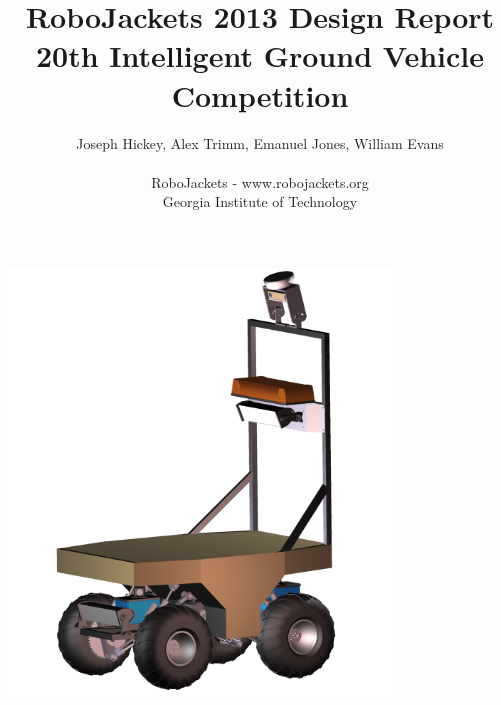 \documentclass[letterpaper,12pt]{article}
\title{RoboJackets 2013 Design Report\\\large{20th Intelligent Ground Vehicle Competition}}
\author{
Joseph Hickey, Alex Trimm, Emanuel Jones, William Evans
\\
\\
RoboJackets - www.robojackets.org
\\
Georgia Institute of Technology
}
\date{}
\begin{document}
\maketitle
\thispagestyle{empty}
\begin{center}
\includegraphics[width=4in]{./Pics/Misti_Vehicle.png}
\end{center}

%

\newpage
\setcounter{tocdepth}{2}
\tableofcontents

\newpage
\listoffigures
\listoftables

\newpage








%



%
\end{document}
